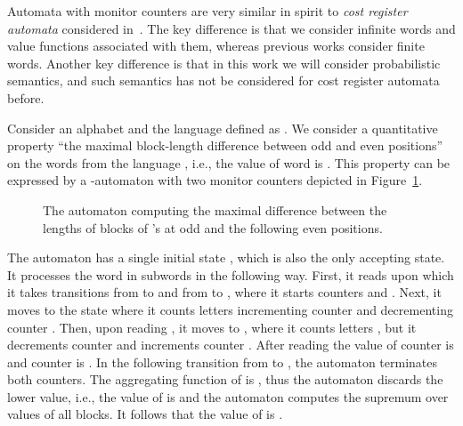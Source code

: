 \documentclass{lmcs}
\begin{document}
\begin{rem}
Automata with monitor counters are very similar in spirit to \emph{cost register automata} considered
in~\cite{DBLP:conf/lics/AlurDDRY13}. The key difference is that we consider infinite words and value functions
associated with them, whereas previous works consider finite words.
Another key difference is that in this work we will consider probabilistic semantics, and
such semantics has not be considered for cost register automata before.
\end{rem}

\begin{exa}\label{ex:AMC}
Consider an alphabet  and the language  defined as .
We consider a quantitative property ``the maximal block-length difference between odd and even positions'' on the words from the language , i.e.,
the value of word  is .
This property can be expressed by a -automaton  with two monitor counters depicted in Figure~\ref{fig:autDiff}.

\begin{figure}
\begin{center}
\end{center}
\caption{The automaton  computing the maximal difference between the lengths of blocks of 's at odd and the following even positions.}\label{fig:autDiff}
\end{figure}

The automaton  has a single initial state , which is also the only accepting state.
It processes the word  in subwords  in the following way.
First, it reads  upon which it takes transitions from  to  and from  to , where it  starts counters  and .
Next, it moves to the state  where it counts letters  incrementing counter  and decrementing counter .
Then, upon reading , it moves to , where it counts letters , but it decrements counter  and increments counter .
After reading  the value of counter  is  and counter  is .
In the following transition from  to , the automaton terminates both counters.
The aggregating function  of  is , thus the automaton discards the lower value, i.e.,
the value of  is  and the automaton computes the supremum over values of all blocks.
It follows that the value of  is .
\end{exa}
\end{document}
